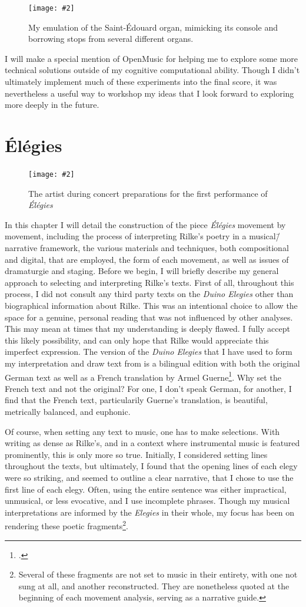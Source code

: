 \documentclass[12pt,twoside,maitrise]{dms_ks}
\newcommand{\customincludegraphics}[4][]{%
    \begin{figure}[H]
        \centering
        \texttt{[image: \#2]}
        \caption{#4}
	\label{#3} 
    \end{figure}
}
\theoremstyle{definition}
\begin{document}
{\customincludegraphics[scale=0.3]{grand_orgue.png}{fig:grand_orgue}{My emulation of the Saint-Édouard organ, mimicking its console and borrowing stops from several different organs.}

I will make a special mention of OpenMusic for helping me to explore some more technical solutions outside of my cognitive computational ability. 
Though I didn't ultimately implement much of these experiments into the final score, it was nevertheless a useful way to workshop my ideas that I look forward to exploring more deeply in the future.

\chapter{Élégies}

\customincludegraphics[scale=0.7]{2024-04-28_MH.png}{fig:live}{The artist during concert preparations for the first performance of \textit{Élégies}}

In this chapter I will detail the construction of the piece \textit{Élégies} movement by movement, including the process of interpreting Rilke's poetry in a musical\=/narrative framework, the various materials and techniques, both compositional and digital, that are employed, the form of each movement, as well as issues of dramaturgie and staging. Before we begin, I will briefly describe my general approach to selecting and interpreting Rilke's texts. First of all, throughout this process, I did not consult any third party texts on the \textit{Duino Elegies} other than biographical information about Rilke. This was an intentional choice to allow the space for a genuine, personal reading that was not influenced by other analyses. This may mean at times that my understanding is deeply flawed. I fully accept this likely possibility, and can only hope that Rilke would appreciate this imperfect expression. The version of the \textit{Duino Elegies} that I have used to form my interpretation and draw text from is a bilingual edition with both the original German text as well as a French translation by Armel Guerne\footcite{rilke_egies_1986}. Why set the French text and not the original? For one, I don't speak German, for another, I find that the French text, particularily Guerne's translation, is beautiful, metrically balanced, and euphonic.   

Of course, when setting any text to music, one has to make selections. 
With writing as dense as Rilke's, and in a context where instrumental music is featured prominently, this is only more so true. 
Initially, I considered setting lines throughout the texts, but ultimately, I found that the opening lines of each elegy were so striking, and seemed to outline a clear narrative, that I chose to use the first line of each elegy. 
Often, using the entire sentence was either impractical, unmusical, or less evocative, and I use incomplete phrases. 
Though my musical interpretations are informed by the \textit{Elegies} in their whole, my focus has been on rendering these poetic fragments\footnote{Several of these fragments are not set to music in their entirety, with one not sung at all, and another reconstructed. They are nonetheless quoted at the beginning of each movement analysis, serving as a narrative guide.}. 

}
\end{document}
